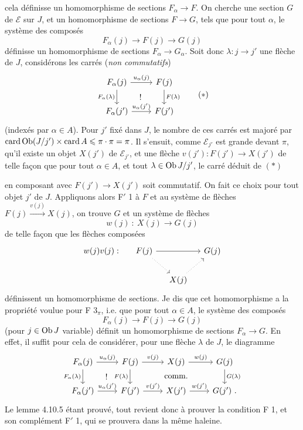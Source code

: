 cela définisse un homomorphisme de sections $F_\alpha\longrightarrow F$. On cherche une section $G$ de $\mathcal{E}$ sur $J$, et un homomorphisme de sections $F\longrightarrow G$, tels que pour tout $\alpha$, le système des composés
\[
F_\alpha(j) \longrightarrow F(j) \longrightarrow G(j)
\]
définisse un homomorphisme de sections $F_\alpha\longrightarrow G_\alpha$. Soit donc $\lambda : j\longrightarrow j'$ une flèche de $J$, considérons les carrés (\textit{non commutatifs}) %
\[
\begin{tikzcd}
F_\alpha(j) \arrow[r,"u_\alpha(j)"] \arrow[d,"F_\alpha(\lambda)"'] \arrow[dr,phantom,"!"] & F(j) \arrow[d,"F(\lambda)"] \\
F_\alpha(j') \arrow[r,"u_\alpha(j')"] & F(j')
\end{tikzcd}
\tag*{$(*)$}
\]
(indexés par $\alpha\in A$). Pour $j'$ fixé dans $J$, le nombre de ces carrés est majoré par $\operatorname{card}\operatorname{Ob}(J/j')\times\operatorname{card} A\leqslant\pi\cdot\pi=\pi$. Il s'ensuit, comme $\mathcal{E}_{j'}$ est grande devant $\pi$, qu'il existe un objet $X(j')$ de $\mathcal{E}_{j'}$, et une flèche $v(j') : F(j')\longrightarrow X(j')$ de telle façon que pour tout $\alpha\in A$, et tout $\lambda\in\operatorname{Ob} J/j'$, le carré déduit de $(*)$

en composant avec $F(j')\longrightarrow X(j')$ soit commutatif. On fait ce choix pour tout objet $j'$ de $J$. Appliquons alors F$'$ 1 à $F$ et au système de flèches $F(j)\xrightarrow{v(j)}X(j)$, on trouve $G$ et un système de flèches
\[
w(j)\ :\ X(j) \longrightarrow G(j)
\]
de telle façon que les flèches composées
\[
\begin{tikzcd}[column sep=small]
w(j)v(j) : & F(j) \arrow[rr] \arrow[dr,dotted] & & G(j) \\
& & X(j) \arrow[ur,dotted] &
\end{tikzcd}
\]
définissent un homomorphisme de sections. Je dis que cet homomorphisme a la propriété voulue pour F $3_\pi$, i.e. que pour tout $\alpha\in A$, le système des composés
\[
F_\alpha(j) \longrightarrow F(j) \longrightarrow G(j)
\]
(pour $j\in\operatorname{Ob} J$ variable) définit un homomorphisme de sections $F_\alpha\longrightarrow G$. En effet, il suffit pour cela de considérer, pour une flèche $\lambda$ de $J$, le
diagramme
\[
\begin{tikzcd}
F_\alpha(j) \arrow[r,"u_\alpha(j)"] \arrow[d,"F_\alpha(\lambda)"'] \arrow[dr,phantom,"!"] & F(j) \arrow[r,"v(j)"] \arrow[d,"F(\lambda)"'] & X(j) \arrow[r,"w(j)"] \arrow[d,phantom,"\text{comm.}"] & G(j) \arrow[d,"G(\lambda)"] \\
F_\alpha(j') \arrow[r,"u_\alpha(j')"] & F(j') \arrow[r,"v(j')"] & X(j') \arrow[r,"w(j')"] & G(j')\ .
\end{tikzcd}
\]
Le lemme 4.10.5 étant prouvé, tout revient donc à prouver la condition F 1, et son complément F$'$ 1, qui se prouvera dans la même haleine.


